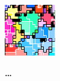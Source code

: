 \documentclass[varwidth=5in]{standalone}
\begin{document}
\noindent\begin{minipage}{\textwidth}
\begin{minipage}{0.8\textwidth}
  \includegraphics[width=\textwidth]{subgrids/subgrid-18.pdf}
\end{minipage}%
\begin{minipage}{0.2\textwidth}
\Huge
\textbf{\dots}
\end{minipage}%
\end{minipage}%

\begin{minipage}{\textwidth}
\begin{minipage}{0.8\textwidth}
\Huge
\centering
{}
\end{minipage}%
\begin{minipage}{0.2\textwidth}
\end{minipage}%
\end{minipage}%
\end{document}
